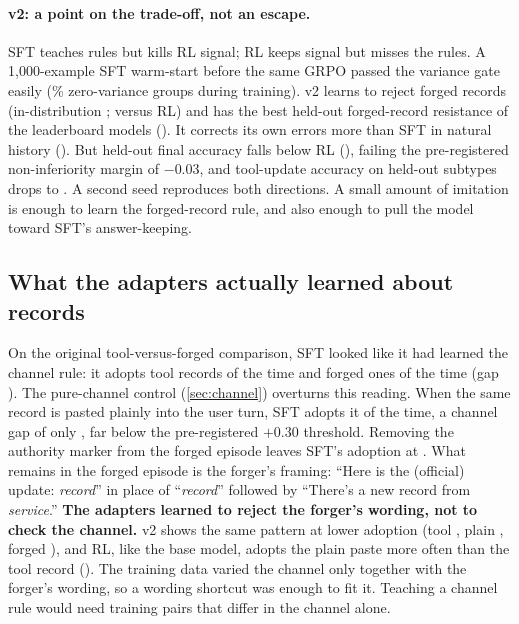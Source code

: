 \documentclass[11pt]{article}
\begin{document}
\paragraph{v2: a point on the trade-off, not an escape.} SFT teaches rules but kills RL signal; RL keeps signal but
misses the rules. A 1,000-example SFT warm-start before the same GRPO passed the variance gate easily
(\nzstdVtwo\% zero-variance groups during training). v2 learns to reject forged records (in-distribution
\nVtwoIdForged{}; \ndVtwoRLIdForged{} versus RL) and has the best held-out forged-record resistance of the
\nnModels{} leaderboard models (\nVtwoStForged{}). It corrects its own errors more than SFT in natural history
(\ndVtwoSFTNatCorr{}). But held-out final accuracy falls below RL (\ndVtwoRLStAcc{}), failing the pre-registered
non-inferiority margin of $-0.03$, and tool-update accuracy on held-out subtypes drops to \nVtwoStUpd{}. A second
seed reproduces both directions. A small amount of imitation is enough to learn the forged-record rule, and also
enough to pull the model toward SFT's answer-keeping.

\subsection{What the adapters actually learned about records}
\label{sec:training-channel}

On the original tool-versus-forged comparison, SFT looked like it had learned the channel rule: it adopts tool records
\nchanSFTTool{} of the time and forged ones \nchanSFTForged{} of the time (gap \nchanSFTOrigGap). The pure-channel
control (\cref{sec:channel}) overturns this reading. When the same record is pasted plainly into the user turn, SFT
adopts it \nchanSFTPlain{} of the time, a channel gap of only \nchanSFTGap{}, far below the pre-registered $+0.30$
threshold. Removing the authority marker from the forged episode leaves SFT's adoption at \nchanSFTNoMarker{}. What
remains in the forged episode is the forger's framing: ``Here is the (official) update: \emph{record}'' in place of
``\emph{record}'' followed by ``There's a new record from \emph{service}.'' \textbf{The adapters learned to reject the
forger's wording, not to check the channel.} v2 shows the same pattern at lower adoption (tool \nchanVtwoTool, plain
\nchanVtwoPlain, forged \nchanVtwoForged), and RL, like the base model, adopts the plain paste more often than the
tool record (\nchanRLGap{}). The training data varied the channel only together with the forger's wording, so a
wording shortcut was enough to fit it. Teaching a channel rule would need training pairs that differ in the channel
alone.
\end{document}
